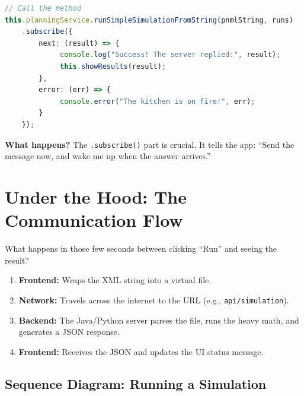 \documentclass[a4paper,11pt,oneside]{report}
\begin{document}
\begin{lstlisting}[language=TypeScript]
// Call the method
this.planningService.runSimpleSimulationFromString(pnmlString, runs)
    .subscribe({
        next: (result) => {
             console.log("Success! The server replied:", result);
             this.showResults(result);
        },
        error: (err) => {
             console.error("The kitchen is on fire!", err);
        }
    });
\end{lstlisting}

\textbf{What happens?} The \texttt{.subscribe()} part is crucial. It tells the app: ``Send the message now, and wake me up when the answer arrives.''

\section{Under the Hood: The Communication Flow}

What happens in those few seconds between clicking ``Run'' and seeing the result?

\begin{enumerate}
    \item \textbf{Frontend:} Wraps the XML string into a virtual file.
    \item \textbf{Network:} Travels across the internet to the URL (e.g., \texttt{api/simulation}).
    \item \textbf{Backend:} The Java/Python server parses the file, runs the heavy math, and generates a JSON response.
    \item \textbf{Frontend:} Receives the JSON and updates the UI status message.
\end{enumerate}

\subsection{Sequence Diagram: Running a Simulation}

%
%     
%     
%     
%     
%     
\end{document}
